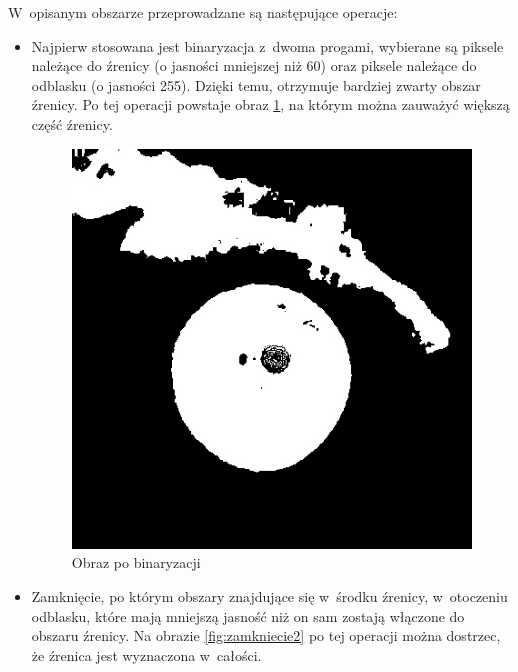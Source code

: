W~opisanym obszarze przeprowadzane są następujące operacje:
\begin{itemize}
\item Najpierw stosowana jest binaryzacja z~dwoma progami, wybierane są piksele należące do źrenicy (o jasności mniejszej niż 60) oraz piksele należące do odblasku (o jasności 255). Dzięki temu, otrzymuje bardziej zwarty obszar źrenicy. Po tej operacji powstaje obraz \ref{fig:binaryzacja2}, na którym można zauważyć większą część źrenicy.
\begin{figure}
\begin{center}
\includegraphics[scale=0.5]{binaryzacja2.jpg}
\caption{Obraz po binaryzacji}
\label{fig:binaryzacja2}
\end{center}
\end{figure}
\item Zamknięcie, po którym obszary znajdujące się w~środku źrenicy, w~otoczeniu odblasku, które mają mniejszą jasność niż on sam zostają włączone do obszaru źrenicy. Na obrazie \ref{fig:zamkniecie2} po tej operacji można dostrzec, że źrenica jest wyznaczona w~całości.
\begin{figure}
\begin{center}

\end{center}
\end{figure}
\end{itemize}
